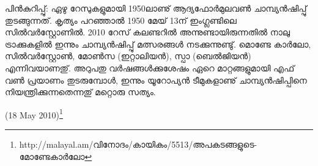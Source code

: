 പിന്‍കുറിപ്പു്: ഏഴു റേസുകളുമായി 1950ലാണു് ആദ്യഫോര്‍മുലവണ്‍ ചാമ്പ്യന്‍ഷിപ്പു് തുടങ്ങുന്നത്. കൃത്യം പറഞ്ഞാല്‍ 
1950 മേയ് 13ന് ഇംഗ്ലണ്ടിലെ സില്‍വര്‍സ്റ്റോണില്‍. 2010 റേസ് കലണ്ടറില്‍ അന്നുണ്ടായിരുന്നതില്‍ നാലു 
ട്രാക്കുകളില്‍ ഇന്നും ചാമ്പ്യന്‍ഷിപ്പു് മത്സരങ്ങള്‍ നടക്കുന്നുണ്ടു്. മൊണ്ടേ കാര്‍ലോ, സില്‍വര്‍സ്റ്റോണ്‍, മോണ്‍സ 
(ഇറ്റാലിയന്‍), സ്പാ (ബെല്‍ജിയന്‍) എന്നിവയാണതു്. അറുപതു വര്‍ഷങ്ങള്‍ക്കുശേഷം ഏറെ മാറ്റങ്ങളുമായി എഫ് 
വണ്‍ പ്രയാണം തുടരുമ്പോള്‍, ഇന്നും യൂറോപ്യന്‍ ടീമുകളാണു് ചാമ്പ്യന്‍ഷിപ്പിനെ നിയന്ത്രിക്കുന്നതെന്നതു് മറ്റൊരു 
സത്യം.

(18 May 2010)\footnote{http://malayal.am/വിനോദം/കായികം/5513/അപകടങ്ങളുടെ-മോണ്ടേകാര്‍ലോ}

\newpage
